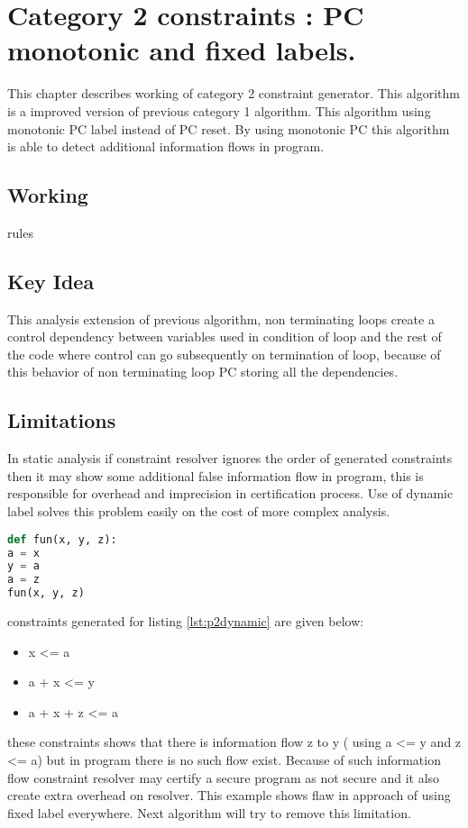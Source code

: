 \chapter{Category 2 constraints : PC monotonic and fixed labels.}
This chapter describes working of category 2 constraint generator. This algorithm is a improved version of previous category 1 algorithm. This algorithm using monotonic PC label instead of PC reset. By using monotonic PC this algorithm is able to detect additional information flows in program.
\section{Working}
rules
\section{Key Idea}
This analysis extension of previous algorithm, non terminating loops
create a control dependency between variables used in condition of loop and
the rest of the code where control can go subsequently on termination of loop,
because of this behavior of non terminating loop PC storing all the dependencies.

\section{Limitations}  
In static analysis if constraint resolver ignores the order of generated constraints then it may show some additional false information flow in program, this is responsible for overhead and imprecision in certification process. Use of dynamic label solves this problem easily on the cost of more complex analysis.
\begin{lstlisting}[language=Python, caption=Python version of dynamic label example in \cite{denning}. goal: information flow from x to y, label={lst:p2dynamic} ]
def fun(x, y, z):
a = x
y = a
a = z
fun(x, y, z)
\end{lstlisting}
constraints generated for listing \ref{lst:p2dynamic} are given below:
\begin{itemize}
	\item x <= a
	\item a + x <= y
    \item a + x + z <= a
\end{itemize}
these constraints shows that there is information flow z to y ( using a <= y and z <= a) but in program there is no such flow exist. Because of such information flow constraint resolver may certify a secure program as not secure and it also create extra overhead on resolver. This example shows flaw in approach of using fixed label everywhere. Next algorithm will try to remove this limitation.


